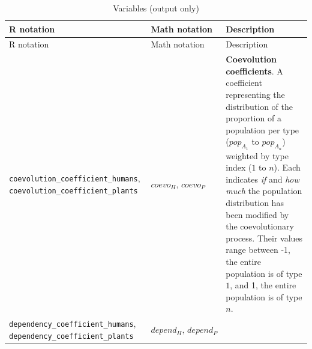 \documentclass[
]{book}
\begin{document}
\begin{longtable}[]{@{}lll@{}}
\caption{Variables (output only)}\tabularnewline
\toprule
\begin{minipage}[b]{0.36\columnwidth}\raggedright
R notation\strut
\end{minipage} & \begin{minipage}[b]{0.21\columnwidth}\raggedright
Math notation\strut
\end{minipage} & \begin{minipage}[b]{0.34\columnwidth}\raggedright
Description\strut
\end{minipage}\tabularnewline
\midrule
\endfirsthead
\toprule
\begin{minipage}[b]{0.36\columnwidth}\raggedright
R notation\strut
\end{minipage} & \begin{minipage}[b]{0.21\columnwidth}\raggedright
Math notation\strut
\end{minipage} & \begin{minipage}[b]{0.34\columnwidth}\raggedright
Description\strut
\end{minipage}\tabularnewline
\midrule
\endhead
\begin{minipage}[t]{0.36\columnwidth}\raggedright
\texttt{coevolution\_coefficient\_humans}, \texttt{coevolution\_coefficient\_plants}\strut
\end{minipage} & \begin{minipage}[t]{0.21\columnwidth}\raggedright
\(coevo_{H},\,coevo_{P}\)\strut
\end{minipage} & \begin{minipage}[t]{0.34\columnwidth}\raggedright
\textbf{Coevolution coefficients}. A coefficient representing the distribution of the proportion of a population per type (\(pop_{A_1}\) to \(pop_{A_n}\)) weighted by type index (\(1\) to \(n\)). Each indicates \emph{if} and \emph{how much} the population distribution has been modified by the coevolutionary process. Their values range between -1, the entire population is of type \(1\), and 1, the entire population is of type \(n\).\strut
\end{minipage}\tabularnewline
\begin{minipage}[t]{0.36\columnwidth}\raggedright
\texttt{dependency\_coefficient\_humans}, \texttt{dependency\_coefficient\_plants}\strut
\end{minipage} & \begin{minipage}[t]{0.21\columnwidth}\raggedright
\(depend_{H},\,depend_{P}\)\strut
\end{minipage} & \begin{minipage}[t]{0.34\columnwidth}\raggedright

\end{minipage}
\end{longtable}
\end{document}
